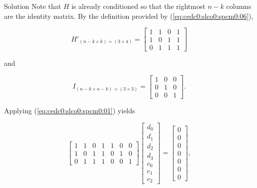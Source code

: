 \begin{vworkexampleparsection}{Solution}
Note that $H$ is already conditioned so that the rightmost $n-k$ columns
are the identity matrix.  By the definition provided by 
(\ref{eq:cedc0:slco0:spcm0:06}),

\begin{equation}
\label{eq:ex:cedc0:slco0:spcm0:01:02b}
H'_{(n-k \times k) = (3 \times 4)} = \left[\begin{array}{cccc}
          1 & 1 & 0 & 1  \\
          1 & 0 & 1 & 1  \\
          0 & 1 & 1 & 1 
          \end{array}\right]
\end{equation}

\noindent{}and

\begin{equation}
\label{eq:ex:cedc0:slco0:spcm0:01:02c}
I_{(n-k \times n-k) = (3 \times 3)}= \left[\begin{array}{ccc}
          1 & 0 & 0 \\
          0 & 1 & 0 \\
          0 & 0 & 1
          \end{array}\right].
\end{equation}
 
Applying (\ref{eq:cedc0:slco0:spcm0:01}) yields

\begin{equation}
\label{eq:ex:cedc0:slco0:spcm0:01:03}
\left[\begin{array}{ccccccc}
          1 & 1 & 0 & 1 & 1 & 0 & 0 \\
          1 & 0 & 1 & 1 & 0 & 1 & 0 \\
          0 & 1 & 1 & 1 & 0 & 0 & 1
          \end{array}\right]
\left[\begin{array}{c}d_0\\d_1\\d_2\\d_3\\c_0\\c_1\\c_2\end{array}\right]  =
\left[\begin{array}{c}0\\0\\0\\0\\0\\0\\0\end{array}\right] ,
\end{equation}


\end{vworkexampleparsection}
